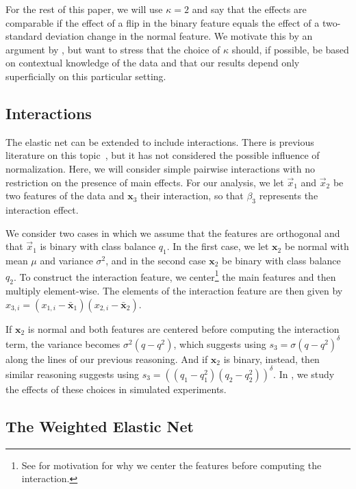 For the rest of this paper, we will use \(\kappa = 2\) and say that the effects are
comparable if the effect of a flip in the binary feature equals the effect of a
two-standard deviation change in the normal feature. We motivate this by an argument by
\citet{gelman2008}, but want to stress that the choice of \(\kappa\) should, if possible,
be based on contextual knowledge of the data and that our results depend only superficially
on this particular setting.

\subsection{Interactions}\label{sec:interactions}

The elastic net can be extended to include interactions. There is previous literature on
this topic~\citep{bien2013,zemlianskaia2022,lim2015}, but it has not considered the
possible influence of normalization. Here, we will consider simple pairwise interactions
with no restriction on the presence of main effects. For our analysis, we let \(\vec{x}_1\)
and \(\vec{x}_2\) be two features of the data and \(\bm{x}_3\) their interaction, so that
\(\beta_3\) represents the interaction effect.

We consider two cases in which we assume that the features are orthogonal and that
\(\vec{x}_1\) is binary with class balance \(q_1\). In the first case, we let \(\bm{x}_2\)
be normal with mean \(\mu\) and variance \(\sigma^2\), and in the second case \(\bm{x}_2\)
be binary with class balance \(q_2\). To construct the interaction feature, we
center\footnote{See  for motivation for why we center the
  features before computing the interaction.} the main features and then multiply
element-wise. The elements of the interaction feature are then given by \(x_{3,i} =
(x_{1,i} - \bar{\bm{x}}_1)(x_{2,i} - \bar{\bm{x}}_2)\).

If \(\bm{x}_2\) is normal and both features are centered before computing the interaction
term, the variance becomes \(\sigma^2 (q-q^2)\), which suggests using \(s_3 = \sigma (q -
q^2)^\delta\) along the lines of our previous reasoning. And if \(\bm{x}_2\) is binary,
instead, then similar reasoning suggests using \(s_3 = ((q_1-q_1^2)(q_2-q_2^2))^\delta\).
In , we study the effects of these choices in simulated
experiments.

\subsection{The Weighted Elastic Net}\label{sec:binary-weighting}

